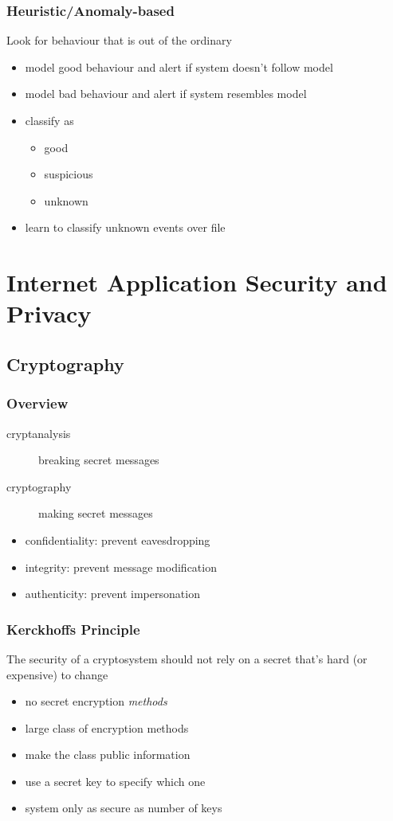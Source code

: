 \documentclass[]{article}
\theoremstyle{definition}
\begin{document}
	\subsubsection{Heuristic/Anomaly-based}
	Look for behaviour that is out of the ordinary
	\begin{itemize}
		\item model good behaviour and alert if system doesn't follow model
		\item model bad behaviour and alert if system resembles model
		\item classify as 
			\begin{itemize}
				\item good
				\item suspicious
				\item unknown
			\end{itemize}
		\item learn to classify unknown events over file
	\end{itemize}
	





	\section{Internet Application Security and Privacy}
	\subsection{Cryptography}
	\subsubsection{Overview}
	\begin{description}
		\item[cryptanalysis] breaking secret messages
		\item[cryptography] making secret messages
	\end{description}
	\begin{itemize}
		\item confidentiality: prevent eavesdropping
		\item integrity: prevent message modification
		\item authenticity: prevent impersonation
	\end{itemize}

	\subsubsection{Kerckhoffs Principle}
	The security of a cryptosystem should not rely on a secret that's hard (or expensive) to change
	\begin{itemize}
		\item no secret encryption \textit{methods}
		\item large class of encryption methods
		\item make the class public information
		\item use a secret key to specify which one
		\item system only as secure as number of keys
	\end{itemize}
	
\end{document}
